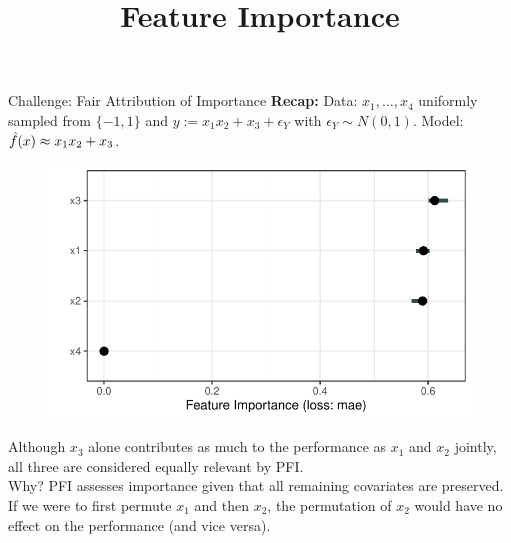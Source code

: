 \documentclass[11pt,compress,t,notes=noshow, xcolor=table]{beamer}
\title{Feature Importance}
\institute{\href{https://compstat-lmu.github.io/lecture_i2ml/}{compstat-lmu.github.io/lecture\_i2ml}}
\date{}
\begin{document}
	
	
	
	
	
	
	
	
	
	

\begin{vbframe}{Challenge: Fair Attribution of Importance}
\textbf{Recap:} Data: $x_1, \dots, x_4$ uniformly sampled from $\{-1, 1\}$ and $y:= x_1 x_2 + x_3 + \epsilon_Y$ with $\epsilon_Y \sim N(0, 1)$. Model: $\fh(x) \approx x_1 x_2 + x_3$.\\

\begin{figure}
\centering
  \includegraphics[width=0.5\linewidth]{figure_man/pfi_interactions.pdf}
\end{figure}

Although $x_3$ alone contributes as much to the performance as $x_1$ and $x_2$ jointly, all three are considered equally relevant by PFI.\\
\lz
Why? PFI assesses importance given that all remaining covariates are preserved. If we were to first permute $x_1$ and then $x_2$, the permutation of $x_2$ would have no effect on the performance (and vice versa).
\end{vbframe}
\end{document}
